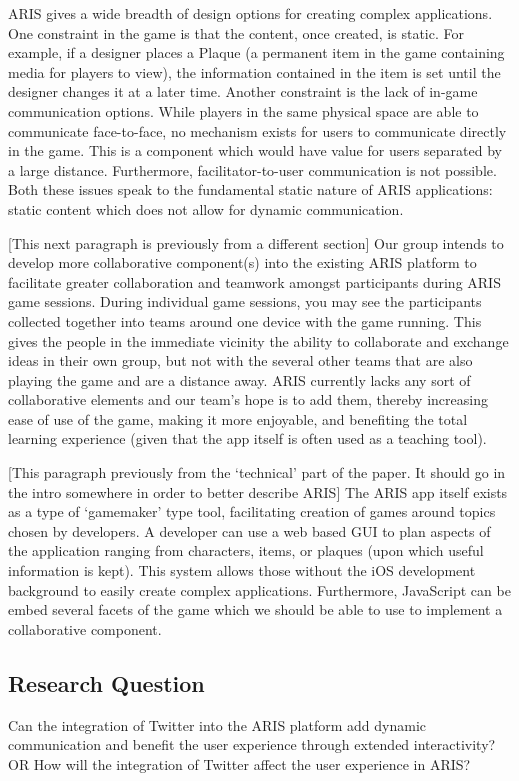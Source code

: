 \documentclass{sigchi}
\begin{document}
ARIS gives a wide breadth of design options for creating complex applications. One constraint in the game is that the content, once created, is static. For example, if a designer places a Plaque (a permanent item in the game containing media for players to view), the information contained in the item is set until the designer changes it at a later time. Another constraint is the lack of in-game communication options. While players in the same physical space are able to communicate face-to-face, no mechanism exists for users to communicate directly in the game. This is a component which would have value for users separated by a large distance. Furthermore, facilitator-to-user communication is not possible. Both these issues speak to the fundamental static nature of ARIS applications: static content  which does not allow for dynamic communication.

[This next paragraph is previously from a different section]
Our group intends to develop more collaborative component(s) into the existing ARIS platform to facilitate greater collaboration and teamwork amongst participants during ARIS game sessions. During individual game sessions, you may see the participants collected together into teams around one device with the game running. This gives the people in the immediate vicinity the ability to collaborate and exchange ideas in their own group, but not with the several other teams that are also playing the game and are a distance away. ARIS currently lacks any sort of collaborative elements and our team’s hope is to add them, thereby increasing ease of use of the game, making it more enjoyable, and benefiting the total learning experience (given that the app itself is often used as a teaching tool).

[This paragraph previously from the `technical' part of the paper. It should go in the intro somewhere in order to better describe ARIS]
The ARIS app itself exists as a type of ‘gamemaker’ type tool, facilitating creation of games around topics chosen by developers. A developer can use a web based GUI to plan aspects of the application ranging from characters, items, or plaques (upon which useful information is kept). This system allows those without the iOS development background to easily create complex applications. Furthermore, JavaScript can be embed several facets of the game which we should be able to use to implement a collaborative component. 

\subsection{Research Question}
Can the integration of Twitter into the ARIS platform add dynamic communication and benefit the user experience through extended interactivity?
OR
How will the integration of Twitter affect the user experience in ARIS?
\end{document}
